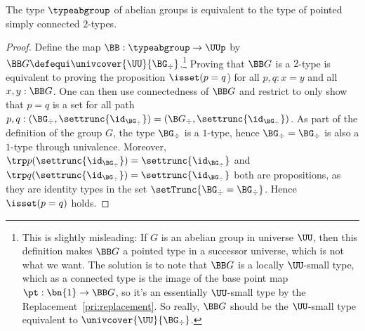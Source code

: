 \begin{theorem}
  The type $\typeabgroup$ of abelian groups is equivalent to the type
  of pointed simply connected $2$-types.
\end{theorem}
\begin{proof}
  Define the map $\BB : \typeabgroup \to \UUp$ by
  $\BB G\defequi \univcover{\UU}{\BG_\div}$.\footnote{%
    This is slightly misleading:
    If $G$ is an abelian group in universe $\UU$,
    then this definition makes $\BB G$ a pointed
    type in a successor universe,
    which is not what we want.
    The solution is to note that $\BB G$ is a
    locally $\UU$-small type,
    which as a connected type
    is the image of the base point map
    $\pt : \bn{1} \to \BB G$,
    so it's an essentially $\UU$-small type
    by the Replacement~\cref{pri:replacement}.
    So really, $\BB G$ should be
    the $\UU$-small type equivalent to
    $\univcover{\UU}{\BG_\div}$.}
  Proving that $\BB G$ is a
  $2$-type is equivalent to proving the proposition $\isset(p=q$) for
  all $p,q:x=y$ and all $x,y:\BB G$. One can then use connectedness of
  $\BB G$ and restrict to only show that $p=q$ is a set for all path
  $p,q:(\BG_\div,\settrunc{\id_{\BG_\div}})=({\B
    G}_\div,\settrunc{\id_{\BG_\div}})$. As part of the definition
  of the group $G$, the type $\BG_\div$ is a $1$-type, hence
  $\BG_\div=\BG_\div$ is also a $1$-type through
  univalence. Moreover,
  $\trp p {(\settrunc{\id_{\BG_\div}})} = \settrunc{\id_{\BG_\div}}$ and
  $\trp q {(\settrunc{\id_{\BG_\div}})} = \settrunc{\id_{\BG_\div}}$ both
  are propositions, as they are identity types in the set
  $\setTrunc{\BG_\div=\BG_\div}$. Hence $\isset(p=q)$ holds.


\end{proof}
